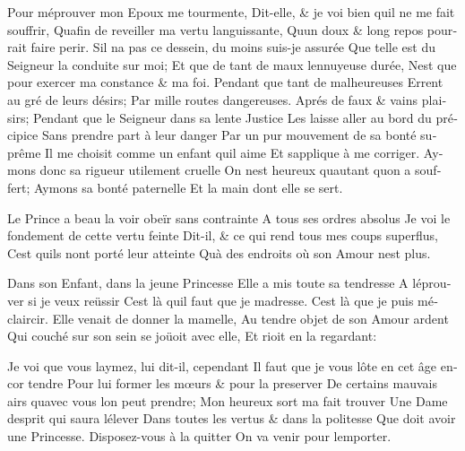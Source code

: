 \documentclass[14pt,a4paper]{memoir}
\begin{document}
{{\begin{otherlanguage}{french}
{Pour m\textquotesingle éprouver mon Epoux me tourmente,} {Dit-elle, \&
je voi bien qu\textquotesingle il ne me fait souffrir,}
{Qu\textquotesingle afin de reveiller ma vertu languissante,}
{Qu\textquotesingle un doux \& long repos pourrait faire perir. }
{S\textquotesingle il n\textquotesingle a pas ce dessein, du moins
suis-je assurée } {Que telle est du Seigneur la conduite sur moi;} {Et
que de tant de maux l\textquotesingle ennuyeuse durée,}
{N\textquotesingle est que pour exercer ma constance \& ma foi. }
{Pendant que tant de malheureuses} {Errent au gré de leurs désirs;} {Par
mille routes dangereuses.} {Aprés de faux \& vains plaisirs;} {Pendant
que le Seigneur dans sa lente Justice} {Les laisse aller au bord du
précipice} {Sans prendre part à leur danger} {Par un pur mouvement de sa
bonté suprême} {Il me choisit comme un enfant qu\textquotesingle il
aime} {Et s\textquotesingle applique à me corriger.} {Aymons donc sa
rigueur utilement cruelle} {On n\textquotesingle est heureux
qu\textquotesingle autant qu\textquotesingle on a souffert;} {Aymons sa
bonté paternelle} {Et la main dont elle se sert.}

{Le Prince a beau la voir obeïr sans contrainte} {A tous ses ordres
absolus} {Je voi le fondement de cette vertu feinte} {Dit-il, \& ce qui
rend tous mes coups superflus,} {C\textquotesingle est
qu\textquotesingle ils n\textquotesingle ont porté leur atteinte}
{Qu\textquotesingle à des endroits où son Amour n\textquotesingle est
plus.}

{Dans son Enfant, dans la jeune Princesse} {Elle a mis toute sa
tendresse} {A l\textquotesingle éprouver si je veux reüssir}
{C\textquotesingle est là qu\textquotesingle il faut que je
m\textquotesingle adresse.} {C\textquotesingle est là que je puis
m\textquotesingle éclaircir.} {Elle venait de donner la mamelle,} {Au
tendre objet de son Amour ardent} {Qui couché sur son sein se joüoit
avec elle,} {Et rioit en la regardant:}

{Je voi que vous l\textquotesingle aymez, lui dit-il, cependant} {Il
faut que je vous l\textquotesingle ôte en cet âge encor tendre } {Pour
lui former les mœurs \& pour la preserver} {De certains mauvais airs
qu\textquotesingle avec vous l\textquotesingle on peut prendre;} {Mon
heureux sort m\textquotesingle a fait trouver} {Une Dame
d\textquotesingle esprit qui saura l\textquotesingle élever} {Dans
toutes les vertus \& dans la politesse} {Que doit avoir une Princesse.}
{Disposez-vous à la quitter} {On va venir pour
l\textquotesingle emporter.}


\end{otherlanguage}}}
\end{document}
